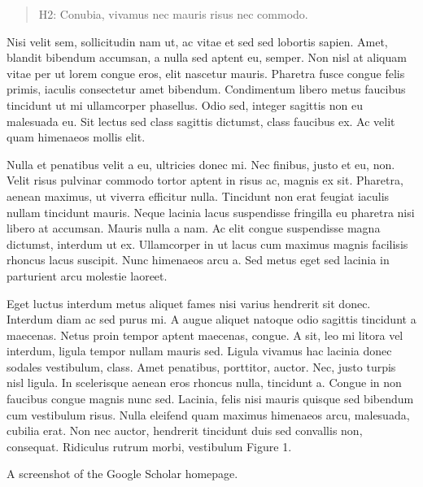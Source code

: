 \documentclass[
  12,
]{article}
\begin{document}
\begin{quote}
H2: Conubia, vivamus nec mauris risus nec commodo.
\end{quote}

Nisi velit sem, sollicitudin nam ut, ac vitae et sed sed lobortis
sapien. Amet, blandit bibendum accumsan, a nulla sed aptent eu, semper.
Non nisl at aliquam vitae per ut lorem congue eros, elit nascetur
mauris. Pharetra fusce congue felis primis, iaculis consectetur amet
bibendum. Condimentum libero metus faucibus tincidunt ut mi ullamcorper
phasellus. Odio sed, integer sagittis non eu malesuada eu. Sit lectus
sed class sagittis dictumst, class faucibus ex. Ac velit quam himenaeos
mollis elit.

Nulla et penatibus velit a eu, ultricies donec mi. Nec finibus, justo et
eu, non. Velit risus pulvinar commodo tortor aptent in risus ac, magnis
ex sit. Pharetra, aenean maximus, ut viverra efficitur nulla. Tincidunt
non erat feugiat iaculis nullam tincidunt mauris. Neque lacinia lacus
suspendisse fringilla eu pharetra nisi libero at accumsan. Mauris nulla
a nam. Ac elit congue suspendisse magna dictumst, interdum ut ex.
Ullamcorper in ut lacus cum maximus magnis facilisis rhoncus lacus
suscipit. Nunc himenaeos arcu a. Sed metus eget sed lacinia in
parturient arcu molestie laoreet.

Eget luctus interdum metus aliquet fames nisi varius hendrerit sit
donec. Interdum diam ac sed purus mi. A augue aliquet natoque odio
sagittis tincidunt a maecenas. Netus proin tempor aptent maecenas,
congue. A sit, leo mi litora vel interdum, ligula tempor nullam mauris
sed. Ligula vivamus hac lacinia donec sodales vestibulum, class. Amet
penatibus, porttitor, auctor. Nec, justo turpis nisl ligula. In
scelerisque aenean eros rhoncus nulla, tincidunt a. Congue in non
faucibus congue magnis nunc sed. Lacinia, felis nisi mauris quisque sed
bibendum cum vestibulum risus. Nulla eleifend quam maximus himenaeos
arcu, malesuada, cubilia erat. Non nec auctor, hendrerit tincidunt duis
sed convallis non, consequat. Ridiculus rutrum morbi, vestibulum Figure
1.

A screenshot of the Google Scholar homepage.
\end{document}
